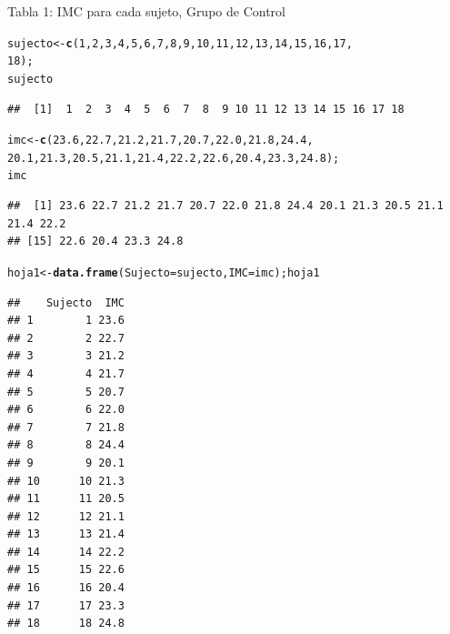 \documentclass[12pt,letterpaper]{article}\usepackage[]{graphicx}\usepackage[]{color}
\makeatletter
\newcommand{\hlnum}[1]{\textcolor[rgb]{0.686,0.059,0.569}{#1}}%
\newcommand{\hlstd}[1]{\textcolor[rgb]{0.345,0.345,0.345}{#1}}%
\newcommand{\hlkwb}[1]{\textcolor[rgb]{0.69,0.353,0.396}{#1}}%
\newcommand{\hlkwc}[1]{\textcolor[rgb]{0.333,0.667,0.333}{#1}}%
\newcommand{\hlkwd}[1]{\textcolor[rgb]{0.737,0.353,0.396}{\textbf{#1}}}%
\newenvironment{kframe}{%
 \def\at@end@of@kframe{}%
 \ifinner\ifhmode%
  \def\at@end@of@kframe{\end{minipage}}%
  \begin{minipage}{\columnwidth}%
 \fi\fi%
 \def\FrameCommand##1{\hskip\@totalleftmargin \hskip-\fboxsep
 \colorbox{shadecolor}{##1}\hskip-\fboxsep
     \hskip-\linewidth \hskip-\@totalleftmargin \hskip\columnwidth}%
 \MakeFramed {\advance\hsize-\width
   \@totalleftmargin\z@ \linewidth\hsize
   \@setminipage}}%
 {\par\unskip\endMakeFramed%
 \at@end@of@kframe}
\newenvironment{knitrout}{}{} %
\makeatother
\begin{document}
Tabla 1: IMC para cada sujeto, Grupo de Control
\begin{knitrout}
\color{fgcolor}\begin{kframe}
\begin{alltt}
\hlstd{sujecto} \hlkwb{<-} \hlkwd{c}\hlstd{(}\hlnum{1}\hlstd{,} \hlnum{2}\hlstd{,} \hlnum{3}\hlstd{,} \hlnum{4}\hlstd{,} \hlnum{5}\hlstd{,} \hlnum{6}\hlstd{,} \hlnum{7}\hlstd{,} \hlnum{8}\hlstd{,} \hlnum{9}\hlstd{,} \hlnum{10}\hlstd{,} \hlnum{11}\hlstd{,} \hlnum{12}\hlstd{,} \hlnum{13}\hlstd{,} \hlnum{14}\hlstd{,} \hlnum{15}\hlstd{,} \hlnum{16}\hlstd{,} \hlnum{17}\hlstd{,}
                       \hlnum{18}\hlstd{);}
\hlstd{sujecto}
\end{alltt}
\begin{verbatim}
##  [1]  1  2  3  4  5  6  7  8  9 10 11 12 13 14 15 16 17 18
\end{verbatim}
\begin{alltt}
\hlstd{imc} \hlkwb{<-} \hlkwd{c}\hlstd{(}\hlnum{23.6}\hlstd{,} \hlnum{22.7}\hlstd{,} \hlnum{21.2}\hlstd{,} \hlnum{21.7}\hlstd{,} \hlnum{20.7}\hlstd{,} \hlnum{22.0}\hlstd{,} \hlnum{21.8}\hlstd{,} \hlnum{24.4}\hlstd{,}
                    \hlnum{20.1}\hlstd{,} \hlnum{21.3}\hlstd{,} \hlnum{20.5}\hlstd{,} \hlnum{21.1}\hlstd{,} \hlnum{21.4}\hlstd{,} \hlnum{22.2}\hlstd{,} \hlnum{22.6}\hlstd{,} \hlnum{20.4}\hlstd{,} \hlnum{23.3}\hlstd{,} \hlnum{24.8}\hlstd{);}
\hlstd{imc}
\end{alltt}
\begin{verbatim}
##  [1] 23.6 22.7 21.2 21.7 20.7 22.0 21.8 24.4 20.1 21.3 20.5 21.1 21.4 22.2
## [15] 22.6 20.4 23.3 24.8
\end{verbatim}
\begin{alltt}
\hlstd{hoja1} \hlkwb{<-} \hlkwd{data.frame}\hlstd{(}\hlkwc{Sujecto}\hlstd{=sujecto,} \hlkwc{IMC}\hlstd{=imc); hoja1}
\end{alltt}
\begin{verbatim}
##    Sujecto  IMC
## 1        1 23.6
## 2        2 22.7
## 3        3 21.2
## 4        4 21.7
## 5        5 20.7
## 6        6 22.0
## 7        7 21.8
## 8        8 24.4
## 9        9 20.1
## 10      10 21.3
## 11      11 20.5
## 12      12 21.1
## 13      13 21.4
## 14      14 22.2
## 15      15 22.6
## 16      16 20.4
## 17      17 23.3
## 18      18 24.8
\end{verbatim}
\end{kframe}
\end{knitrout}
\end{document}
